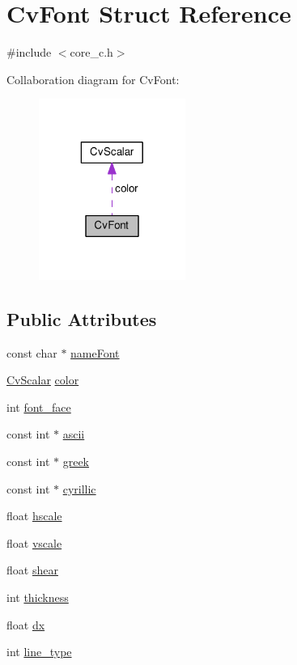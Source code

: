 \hypertarget{structCvFont}{\section{Cv\-Font Struct Reference}
\label{structCvFont}
}


{\ttfamily \#include $<$core\-\_\-c.\-h$>$}



Collaboration diagram for Cv\-Font\-:\nopagebreak
\begin{figure}[H]
\begin{center}
\leavevmode
\includegraphics[width=136pt]{structCvFont__coll__graph}
\end{center}
\end{figure}
\subsection*{Public Attributes}
\begin{DoxyCompactItemize}
\item 
const char $\ast$ \hyperlink{structCvFont_afcf7e25a5fb94a5a35a75f073bd3a3d0}{name\-Font}
\item 
\hyperlink{structCvScalar}{Cv\-Scalar} \hyperlink{structCvFont_a91b24265cbcfefbd12da8974588f47b6}{color}
\item 
int \hyperlink{structCvFont_a2de0fc46f5753aa4c116f458892e62d0}{font\-\_\-face}
\item 
const int $\ast$ \hyperlink{structCvFont_afc9430164e0b91a85965e034001c4b70}{ascii}
\item 
const int $\ast$ \hyperlink{structCvFont_af55a3757145c476173f919e847bbca30}{greek}
\item 
const int $\ast$ \hyperlink{structCvFont_a7b29fd406e20a69b222fbe66236f681d}{cyrillic}
\item 
float \hyperlink{structCvFont_a5c8d8de16accb4814af7467131cd8097}{hscale}
\item 
float \hyperlink{structCvFont_ada5bc81a795b54864e5b4584223281e2}{vscale}
\item 
float \hyperlink{structCvFont_a8c8c6ec0d06f325d1f6d460993ef9cd1}{shear}
\item 
int \hyperlink{structCvFont_a9a7b17d7af1c32cc0955997ba87e0729}{thickness}
\item 
float \hyperlink{structCvFont_ab6075f079d1c8be002a320f93c4a1824}{dx}
\item 
int \hyperlink{structCvFont_aad561dba61a70aea869ea429bf692299}{line\-\_\-type}
\end{DoxyCompactItemize}


